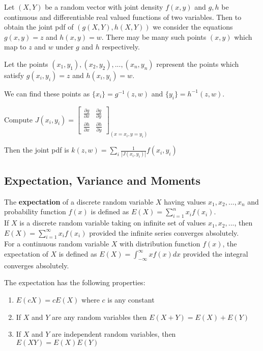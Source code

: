 \begin{prop}
    Let $(X,Y)$ be a random vector with joint density $f(x,y)$ and $g,h$ be continuous and differentiable real valued functions of two variables. Then to obtain the joint pdf of $(g(X,Y), h(X,Y))$ we consider the equations $g(x,y) = z$ and $h(x,y) = w$. There may be many such points $(x,y)$ which map to $z$ and $w$ under $g$ and $h$ respectively.

    Let the points $(x_1, y_1), (x_2, y_2), ..., (x_n, y_n)$ represent the points which satisfy $g(x_i, y_i) = z$ and $h(x_i, y_i) = w$.

    We can find these points as $\{x_i\} = g^{-1}(z,w)$ and $\{ y_i \} = h^{-1}(z,w)$.

    Compute $J(x_i, y_i) = \begin{bmatrix} \frac{\partial g}{\partial x} & \frac{\partial g}{\partial y} \\ \frac{\partial h}{\partial x} & \frac{\partial h}{\partial y} \end{bmatrix}_{(x = x_i, y = y_i)}$

        Then the joint pdf is $k(z,w) = \displaystyle \sum_i \frac{1}{|J(x_i, y_i)|} f(x_i, y_i)$
\end{prop}

\hhrule
\subsection*{Expectation, Variance and Moments}

\begin{defn}
    The \textbf{expectation} of a discrete random variable $X$ having values $x_1, x_2, ..., x_n$ and probability function $f(x)$ is defined as $E\left (X\right ) = \sum_{i=1}^n x_i f\left (x_i\right )$.
    \\

    If $X$ is a discrete random variable taking on infinite set of values $x_1, x_2, ...$, then $E(X) = \sum_{i=1}^\infty x_i f(x_i)$ provided the infinite series converges absolutely.
    \\

    For a continuous random variable $X$ with distribution function $f(x)$, the expectation of $X$ is defined as $E(X) = \int_{- \infty}^\infty x f(x) dx$ provided the integral converges absolutely.
\end{defn}


\begin{samepage}
\begin{thm}
    The expectation has the following properties:

    \begin{enumerate}
        \item $E(c X) = c E(X)$ where $c$ is any constant
        \item If $X$ and $Y$ are any random variables then $E(X + Y) = E(X) + E(Y)$
        \item If $X$ and $Y$ are independent random variables, then $E(XY) = E(X)E(Y)$
    \end{enumerate}
\end{thm}
\end{samepage}

